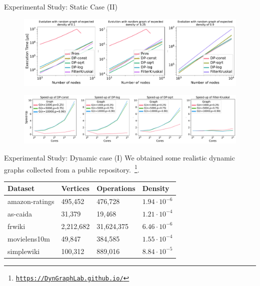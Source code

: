 \begin{frame}{Experimental Study: Static Case (II)}
    \begin{figure}
            \centering
            \includegraphics[width=1\linewidth]{figures/SomeDensities_mixed.pdf}
    \end{figure}

    \begin{figure}
            \centering
            \includegraphics[width=1\linewidth]{figures/SpeedUpDPandFK_sample.pdf}
    \end{figure}
\end{frame}

\begin{frame}{Experimental Study: Dynamic case (I)}
We obtained some realistic dynamic graphs collected from a public repository.~\footnote{\href{https://DynGraphLab.github.io/}{\texttt{https://DynGraphLab.github.io/}}}. 

\begin{table}[H]
\centering
\begin{tabular}{@{}llll@{}}
\toprule
Dataset        & Vertices  & Operations & Density \\ \midrule
amazon-ratings & 495,452   & 476,728    & $1.94\cdot10^{-6}$ \\
as-caida       & 31,379    & 19,468     & $1.21\cdot10^{-4}$ \\
frwiki         & 2,212,682 & 31,624,375 & $6.46\cdot10^{-6}$ \\
movielens10m   & 49,847    & 384,585    & $1.55\cdot10^{-4}$ \\
simplewiki     & 100,312   & 889,016    & $8.84\cdot10^{-5}$ \\ \bottomrule
\end{tabular}
\end{table}
\end{frame}

